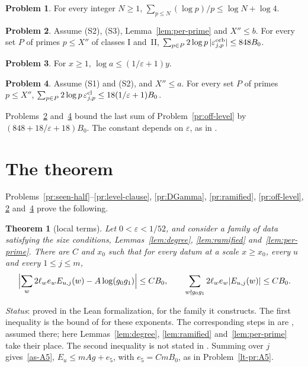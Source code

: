 \documentclass[reqno]{amsart}
\theoremstyle{definition}
\newtheorem{problem}{Problem}[section]
\theoremstyle{plain}
\newtheorem{theorem}{Theorem}[section]
\theoremstyle{remark}
\begin{document}
\begin{problem}\label{pr:mertens}
For every integer \(N\ge1\), \(\sum_{p\le N}(\log p)/p\le\log N+\log4\).
\end{problem}

\begin{problem}\label{pr:sum-I}
Assume (S2), (S3), Lemma~\ref{lem:per-prime} and \(X''\le b\).  For every set \(P\) of primes \(p\le X''\) of classes I and~II,
\(\sum_{p\in P}2\log p\,\lvert\varepsilon^{\rm orb}_{j,p}\rvert\le848B_0\).
\end{problem}

\begin{problem}\label{pr:log-a}
For \(x\ge1\), \(\log a\le(1/\varepsilon+1)y\).
\end{problem}

\begin{problem}\label{pr:sum-C}
Assume (S1) and (S2), and \(X''\le a\).  For every set \(P\) of primes \(p\le X''\),
\(\sum_{p\in P}2\log p\,\varepsilon^{\rm cl}_{j,p}\le18(1/\varepsilon+1)B_0\).
\end{problem}

Problems~\ref{pr:sum-I} and~\ref{pr:sum-C} bound the last sum of Problem~\ref{pr:off-level} by \((848+18/\varepsilon+18)B_0\).  The constant depends on \(\varepsilon\), as in \cite[Rem.~16.9]{Adr}.

\section{The theorem}\label{sec:theorem}

Problems~\ref{pr:seen-half}--\ref{pr:level-clause}, \ref{pr:DGamma}, \ref{pr:ramified}, \ref{pr:off-level}, \ref{pr:sum-I} and~\ref{pr:sum-C} prove the following.

\begin{theorem}[local terms]\label{thm:local}
Let \(0<\varepsilon<1/52\), and consider a family of data satisfying the size conditions, Lemmas~\ref{lem:degree}, \ref{lem:ramified} and~\ref{lem:per-prime}.  There are \(C\) and \(x_0\) such that for every datum at a scale \(x\ge x_0\), every \(u\) and every \(1\le j\le m\),
\[
 \Bigl\lvert\sum_w2\ell_we_wE_{u,j}(w)-A\log(g_0g_1)\Bigr\rvert\le CB_0,\qquad
 \sum_{w\nmid g_0g_1}2\ell_we_w\lvert E_{u,j}(w)\rvert\le CB_0 .
\]
\end{theorem}
\noindent\emph{Status}: proved in the Lean formalization, for the family it constructs.  The first inequality is the bound of \cite[Thm.~16.6]{Adr} for these exponents.  The corresponding steps in \cite{Adr} are \cite[Hyps.~16.13 and~16.14]{Adr}, assumed there; here Lemmas~\ref{lem:degree}, \ref{lem:ramified} and~\ref{lem:per-prime} take their place.  The second inequality is not stated in \cite{Adr}.  Summing over \(j\) gives~\eqref{as-A5}, \(E_u\le mAg+e_5\), with \(e_5=CmB_0\), as in Problem~\ref{lt-pr:A5}.
\end{document}
